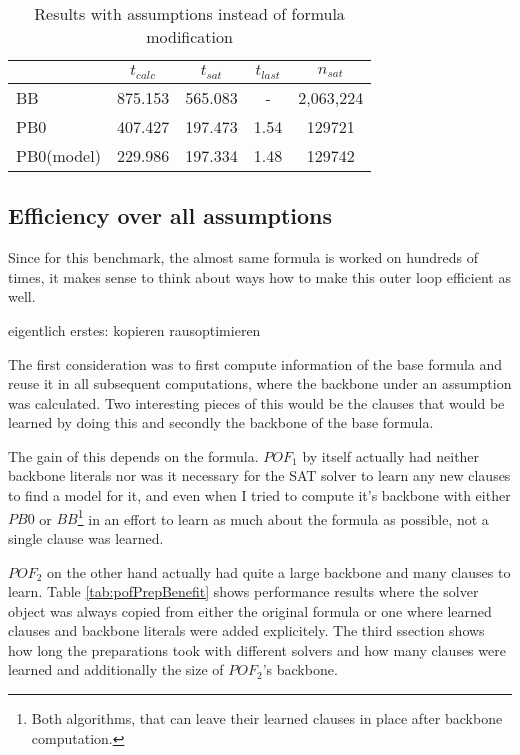 \begin{wraptable}{l}{8cm}
\begin{tabular}{l| c c c c}
& $t_{calc}$ & $t_{sat}$ & $t_{last}$ & $n_{sat}$ \\
\hline
BB & 875.153 & 565.083 & - & 2,063,224\\
PB0 & 407.427 & 197.473 & 1.54 & 129721\\
PB0(model) & 229.986 & 197.334 & 1.48 & 129742\\
\end{tabular}
\caption{Results with assumptions instead of formula modification}
\label{tab:pofAssump}
\end{wraptable}




\subsection{Efficiency over all assumptions}
Since for this benchmark, the almost same formula is worked on hundreds of times, it makes sense to think about ways how to make this outer loop efficient as well.

eigentlich erstes: kopieren rausoptimieren

The first consideration was to first compute information of the base formula and reuse it in all subsequent computations, where the backbone under an assumption was calculated. Two interesting pieces of this would be the clauses that would be learned by doing this and secondly the backbone of the base formula.

The gain of this depends on the formula. $POF_1$ by itself actually had neither backbone literals nor was it necessary for the SAT solver to learn any new clauses to find a model for it, and even when I tried to compute it's backbone with either $PB0$ or $BB$\footnote{Both algorithms, that can leave their learned clauses in place after backbone computation.} in an effort to learn as much about the formula as possible, not a single clause was learned.

$POF_2$ on the other hand actually had quite a large backbone and many clauses to learn. Table \ref{tab:pofPrepBenefit} shows performance results where the solver object was always copied from either the original formula or one where learned clauses and backbone literals were added explicitely. The third ssection shows how long the preparations took with different solvers and how many clauses were learned and additionally the size of $POF_2$'s backbone.

